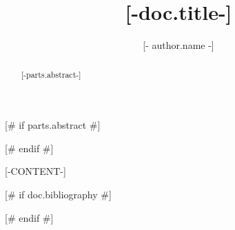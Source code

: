 \documentclass{article}
\title{[-doc.title-]}
\author[[- author.affiliations | join(", ", "index") -]]{[- author.name -]}
[# else #]
\author{[- author.name -]}
[# endif #]
[# endfor #]
\affil[[-affiliation.index-]]{[- affiliation.name -]}
[# endfor #]
\date{\displaydate{articleDate}}
\begin{document}
\maketitle

[# if parts.abstract #]
\begin{abstract}
	[-parts.abstract-]
\end{abstract}
[# endif #]

[-CONTENT-]

[# if doc.bibliography #]

[# endif #]
\end{document}
